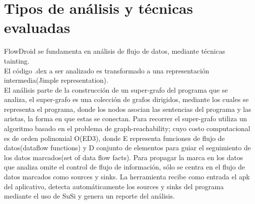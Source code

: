 \section{Tipos de análisis y técnicas evaluadas}
FlowDroid se fundamenta en análisis de flujo de datos, mediante técnicas
tainting.\\
El código .dex a ser analizado es transformado a una representación
intermedia(Jimple representation).\\
El análisis parte de la construcción de un super-grafo del programa que se
analiza, el super-grafo es una colección de grafos dirigidos, mediante los
cuales se representa el programa, donde los nodos asocian las sentencias del
programa y las aristas, la forma en que estas se conectan. Para recorrer el
super-grafo utiliza un algoritmo basado en el problema de
graph-reachability\cite{Graph-reachability}; cuyo costo computacional es de
orden polinomial O(ED3), donde E representa funciones de flujo de datos(dataflow
functions) y D conjunto de elementos para guiar el seguimiento de los
datos marcados(set of data flow facts).\newline
Para propagar la marca en los datos que analiza omite el control de flujo de
información, sólo se centra en el flujo de datos marcados como sources y
sinks.\newline
La herramienta recibe como entrada el apk del aplicativo, detecta
automáticamente los sources y sinks del programa mediante el uso de SuSi y
genera un reporte del análisis.

